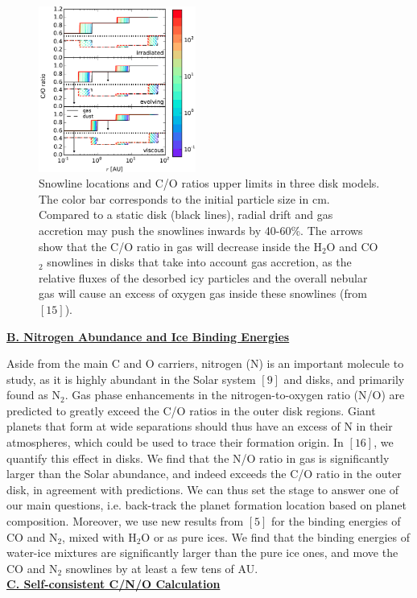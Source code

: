 \documentclass[12pt, letterpaper]{article}
\begin{document}
\begin{figure}
  \begin{center}
    \includegraphics[width=0.46\textwidth]{C_O_ratio_passive_active_disk_many_colorbar_complete_new2}
  \end{center}
  \caption{Snowline locations and C/O ratios upper limits in three disk models. The color bar corresponds to the initial particle size in cm. Compared to a static disk (black lines), radial drift and gas accretion may push the snowlines inwards by 40-60\%. The arrows show that the C/O ratio in gas will decrease inside the H$_2$O and CO$_2$ snowlines in disks that take into account gas accretion, as the relative fluxes of the desorbed icy particles and the overall nebular gas will cause an excess of oxygen gas inside these snowlines (from $[15]$).}
  \vspace{-0.1in}
\end{figure}
\underline{\textbf{B. Nitrogen Abundance and Ice Binding Energies}}

Aside from the main C and O carriers, nitrogen (N) is an important molecule to study, as it is highly abundant in the Solar system $[9]$ and disks, and primarily found as N$_2$. Gas phase enhancements in the nitrogen-to-oxygen ratio (N/O) are predicted to greatly exceed the C/O ratios in the outer disk regions. Giant planets that form at wide separations should thus have an excess of N in their atmospheres, which could be used to trace their formation origin. In $[16]$, we quantify this effect in disks. We find that the N/O ratio in gas is significantly larger than the Solar abundance, and indeed exceeds the C/O ratio in the outer disk, in agreement with predictions. We can thus set the stage to answer one of our main questions, i.e. back-track the planet formation location based on planet composition.  Moreover, we use new results from $[5]$ for the binding energies of CO and N$_2$, mixed with H$_2$O or as pure ices. We find that the binding energies of water-ice mixtures are significantly larger than the pure ice ones, and move the CO and N$_2$ snowlines by at least a few tens of AU. \\
\underline{\textbf{C. Self-consistent C/N/O Calculation}}
\end{document}
